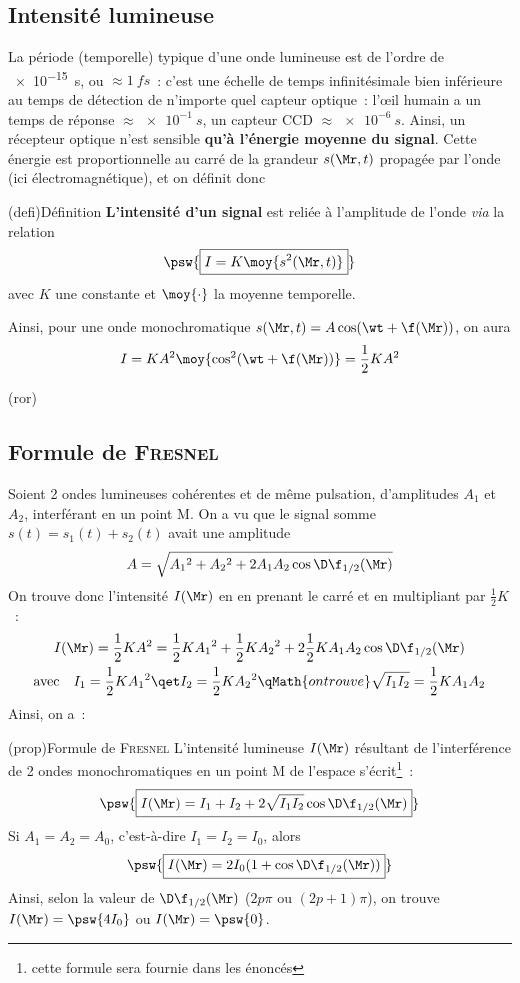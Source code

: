 \documentclass[../../main/main.tex]{subfiles}
\begin{document}
\subsection{Intensité lumineuse}
La période (temporelle) typique d'une onde lumineuse est de l'ordre de
\SI{e-15}{s}, ou $\approx \SI{1}{fs}$~: c'est une échelle de temps
infinitésimale bien inférieure au temps de détection de n'importe quel capteur
optique~: l'œil humain a un temps de réponse $\approx \SI{e-1}{s}$, un capteur
CCD $\approx \SI{e-6}{s}$. Ainsi, un récepteur optique n'est sensible
\textbf{qu'à l'énergie moyenne du signal}. Cette énergie est proportionnelle au
carré de la grandeur $s(\Mr,t)$ propagée par l'onde (ici électromagnétique), et
on définit donc
\begin{tcb}(defi){Définition}
	\textbf{L'intensité d'un signal} est reliée à l'amplitude de l'onde
	\textit{via} la relation
	\[\psw{\boxed{I = K \moy{s^2(\Mr,t)}}}\]
	avec $K$ une constante et $\moy{\cdot}$ la moyenne temporelle.
\end{tcb}
Ainsi, pour une onde monochromatique $s(\Mr,t) = A\cos(\wt+\f(\Mr))$, on aura
\[I = KA^2\moy{\cos^2(\wt+\f(\Mr))} = \frac{1}{2}KA^2\]
\begin{tcb}(ror){}
	\vspace{-10pt}
\end{tcb}

\subsection{Formule de \textsc{Fresnel}}
Soient 2 ondes lumineuses cohérentes et de même pulsation, d'amplitudes $A_1$ et
$A_2$, interférant en un point M. On a vu que le signal somme $s(t) = s_1(t) +
	s_2(t)$ avait une amplitude
\[A = \sqrt{A_1{}^2 + A_2{}^2 + 2A_1A_2\cos\D\f_{1/2}(\Mr)}\]
On trouve donc l'intensité $I(\Mr)$ en en prenant le carré et en multipliant par
$\frac{1}{2}K$~:
\begin{gather*}
	I(\Mr)
	= \frac{1}{2}KA^2
	= \frac{1}{2}KA_1{}^2 + \frac{1}{2}KA_2{}^2 +
	2\frac{1}{2}KA_1A_2\cos\D\f_{1/2}(\Mr)\\
	\text{avec}\quad
	I_1 = \frac{1}{2}KA_1{}^2
	\qet
	I_2 = \frac{1}{2}KA_2{}^2
	\qMath{on trouve}
	\sqrt{I_1I_2} = \frac{1}{2}KA_1A_2
\end{gather*}
Ainsi, on a~:
\begin{tcb}(prop){Formule de \textsc{Fresnel}}
	L'intensité lumineuse $I(\Mr)$ résultant de l'interférence de 2 ondes
	monochromatiques en un point M de l'espace s'écrit\footnote{cette formule
		sera fournie dans les énoncés}~:
	\[\psw{\boxed{I(\Mr) = I_1 + I_2 + 2\sqrt{I_1I_2}\cos\D\f_{1/2}(\Mr)}}\]
	Si $A_1 = A_2 = A_0$, c'est-à-dire $I_1 = I_2 = I_0$, alors
	\[\psw{\boxed{I(\Mr) = 2I_0(1+\cos\D\f_{1/2}(\Mr))}}\]
	Ainsi, selon la valeur de $\D\f_{1/2}(\Mr)$ ($2p\pi$ ou $(2p+1)\pi$), on trouve
	$I(\Mr) = \psw{4I_0}$ ou $I(\Mr) = \psw{0}$.
\end{tcb}
\end{document}
